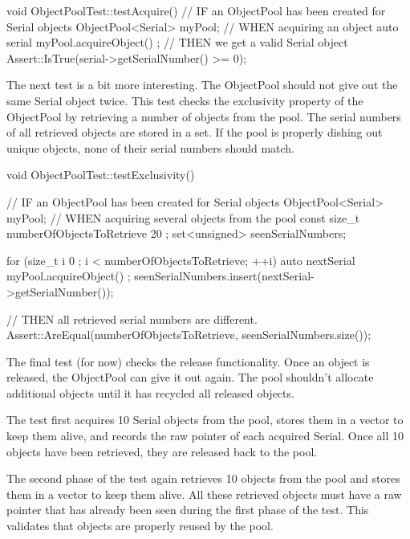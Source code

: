 \begin{cpp}
void ObjectPoolTest::testAcquire()
{
    // IF an ObjectPool has been created for Serial objects
    ObjectPool<Serial> myPool;
    // WHEN acquiring an object
    auto serial { myPool.acquireObject() };
    // THEN we get a valid Serial object
    Assert::IsTrue(serial->getSerialNumber() >= 0);
}
\end{cpp}

The next test is a bit more interesting. The ObjectPool should not give out the same Serial object twice. This test checks the exclusivity property of the ObjectPool by retrieving a number of objects from the pool. The serial numbers of all retrieved objects are stored in a set. If the pool is properly dishing out unique objects, none of their serial numbers should match.

\begin{cpp}
void ObjectPoolTest::testExclusivity()
{
    // IF an ObjectPool has been created for Serial objects
    ObjectPool<Serial> myPool;
    // WHEN acquiring several objects from the pool
    const size_t numberOfObjectsToRetrieve { 20 };
    set<unsigned> seenSerialNumbers;

    for (size_t i { 0 }; i < numberOfObjectsToRetrieve; ++i) {
        auto nextSerial { myPool.acquireObject() };
        seenSerialNumbers.insert(nextSerial->getSerialNumber());
    }

    // THEN all retrieved serial numbers are different.
    Assert::AreEqual(numberOfObjectsToRetrieve, seenSerialNumbers.size());
}
\end{cpp}

The final test (for now) checks the release functionality. Once an object is released, the ObjectPool can give it out again. The pool shouldn’t allocate additional objects until it has recycled all released objects.

The test first acquires 10 Serial objects from the pool, stores them in a vector to keep them alive, and records the raw pointer of each acquired Serial. Once all 10 objects have been retrieved, they are released back to the pool.

The second phase of the test again retrieves 10 objects from the pool and stores them in a vector to keep them alive. All these retrieved objects must have a raw pointer that has already been seen during the first phase of the test. This validates that objects are properly reused by the pool.


